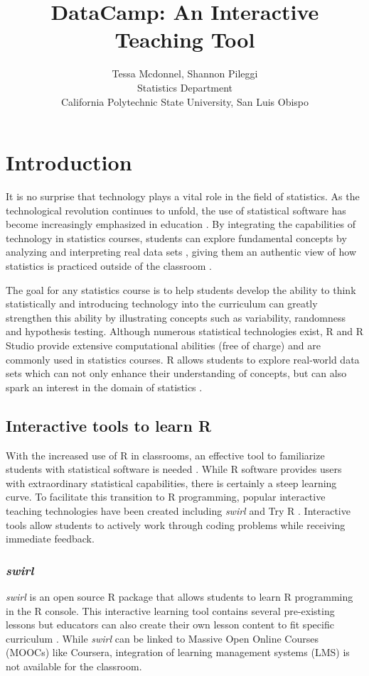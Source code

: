 \documentclass[12pt]{article}\usepackage[]{graphicx}\usepackage[]{color}
\title{DataCamp: An Interactive Teaching Tool}
\author{Tessa Mcdonnel, Shannon Pileggi \\Statistics Department \\ California Polytechnic State University, San Luis Obispo}
\begin{document}
\maketitle

\section{Introduction}

\doublespacing

It is no surprise that technology plays a vital role in the field of statistics. As the technological revolution continues to
unfold, the use of statistical software has become increasingly emphasized in education \citep{AmericanStatisticalAssociation2016}. By integrating the
capabilities of technology in statistics courses, students can explore fundamental concepts by analyzing and
interpreting real data sets \citep{Chance2007, Hardin2015, Horton2014}, giving them an authentic view of how statistics is practiced outside of the
classroom \citep{Wang2017}.

The goal for any statistics course is to help students develop the ability to think statistically
\citep{AmericanStatisticalAssociation2016} and introducing technology into the curriculum can greatly strengthen this ability by illustrating concepts such as
variability, randomness and hypothesis testing. Although numerous statistical technologies exist, R and R Studio
provide extensive computational abilities (free of charge) and are commonly used in statistics courses. R
allows students to explore real-world data sets which can not only enhance their understanding of concepts, but can also spark
an interest in the domain of statistics \citep{Wang2017}.


\subsection{Interactive tools to learn R}
With the increased use of R in classrooms, an effective tool to familiarize students with statistical software is needed
\citep{Baumer2014}. While R software provides users with extraordinary statistical capabilities, there is certainly a steep learning curve. To facilitate
this transition to R programming, popular interactive teaching technologies have been created including \textit{swirl} \citep{Kross} and Try R \citep{TryR}. 
Interactive tools allow students to actively work through coding problems while receiving immediate feedback.

\subsubsection{\textit{swirl}}
\textit{swirl} \citep{Kross} is an
open source R package that allows students to learn R programming in the R console. This interactive learning tool
contains several pre-existing lessons but educators can also create their own
lesson content to fit specific curriculum \citep{Carchedi2014}.
While \textit{swirl} can be linked to Massive Open Online Courses (MOOCs) like Coursera, integration of learning management 
systems (LMS) is not available for the classroom. 
\end{document}
